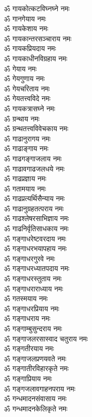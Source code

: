 \begin{multicols}{2}
\begin{flushleft}
ॐ गायकोत्कटविघ्नघ्ने नमः\\
ॐ गानगेयाय नमः\\
ॐ गायकेशाय नमः\hfill{}\\
ॐ गायकान्तरसञ्चाराय नमः\\
ॐ गायकप्रियदाय नमः\\
ॐ गायकाधीनविग्रहाय नमः\\
ॐ गेयाय नमः\\
ॐ गेयगुणाय नमः\\
ॐ गेयचरिताय नमः\\
ॐ गेयतत्त्वविदे नमः\\
ॐ गायकत्रासघ्ने नमः\\
ॐ ग्रन्थाय नमः\\
ॐ ग्रन्थतत्त्वविवेचकाय नमः\hfill{}\\
ॐ गाढानुरागय नमः\\
ॐ गाढाङ्गाय नमः\\
ॐ गाढगङ्गाजलाय नमः\\
ॐ गाढावगाढजलधये नमः\\
ॐ गाढप्रज्ञाय नमः\\
ॐ गतामयाय नमः\\
ॐ गाढप्रत्यर्थिसैन्याय नमः\\
ॐ गाढानुग्रहतत्पराय नमः\\
ॐ गाढश्लेषरसाभिज्ञाय नमः\\
ॐ गाढनिर्वृतिसाधकाय नमः\hfill{}\\
ॐ गङ्गाधरेष्टवरदाय नमः\\
ॐ गङ्गाधरभयापहाय नमः\\
ॐ गङ्गाधरगुरवे नमः\\
ॐ गङ्गाधरध्यातपदाय नमः\\
ॐ गङ्गाधरस्तुताय नमः\\
ॐ गङ्गाधराराध्याय नमः\\
ॐ गतस्मयाय नमः\\
ॐ गङ्गाधरप्रियाय नमः\\
ॐ गङ्गाधराय नमः\\
ॐ गङ्गाम्बुसुन्दराय नमः\hfill{}\\
ॐ गङ्गाजलरसास्वाद चतुराय नमः\\
ॐ गङ्गतीरयाय नमः\\
ॐ गङ्गाजलप्रणयवते नमः\\
ॐ गङ्गातीरविहारकृते नमः\\
ॐ गङ्गाप्रियाय नमः\\
ॐ गङ्गजलावगाहनपराय नमः\\
ॐ गन्धमादनसंवासाय नमः\\
ॐ गन्धमादनकेलिकृते नमः\\

\end{flushleft}
\end{multicols}

